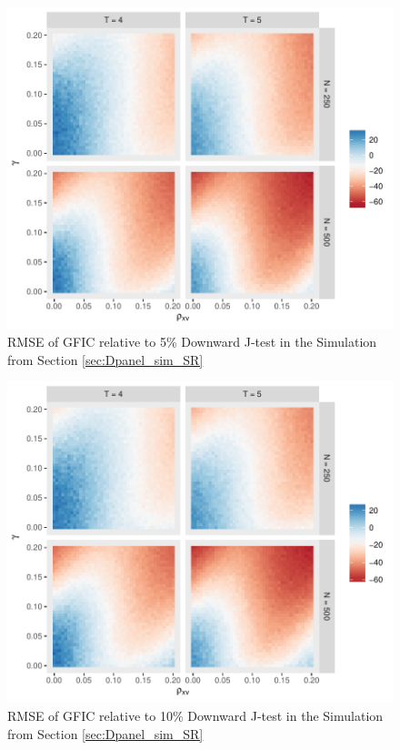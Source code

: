 \begin{figure}
\centering
\includegraphics[scale = 0.8]{./simulations/DynamicPanel/results/Dpanel_GFIC_RMSE_rel_J5}
\caption{RMSE of GFIC relative to 5\% Downward J-test in the Simulation from Section \ref{sec:Dpanel_sim_SR}}
\end{figure}
\begin{figure}
\centering
\includegraphics[scale = 0.8]{./simulations/DynamicPanel/results/Dpanel_GFIC_RMSE_rel_J10}
\caption{RMSE of GFIC relative to 10\% Downward J-test in the Simulation from Section \ref{sec:Dpanel_sim_SR}}
\end{figure}

